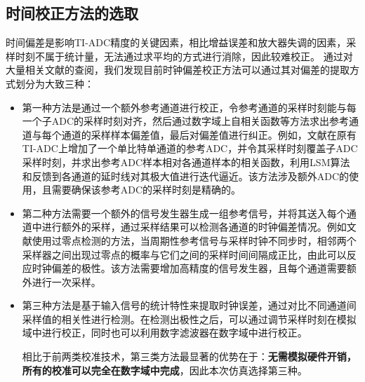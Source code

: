 \documentclass[cs4size,a4paper]{ctexart}
\numberwithin{equation}{section}
\numberwithin{table}{section}
\numberwithin{figure}{section}
\begin{document}
		\subsection{时间校正方法的选取}
		时间偏差是影响TI-ADC精度的关键因素，相比增益误差和放大器失调的因素，采样时刻不属于统计量，无法通过求平均的方式进行消除，因此较难校正。
		通过对大量相关文献的查阅，我们发现目前时钟偏差校正方法可以通过其对偏差的提取方式划分为大致三种：
		\begin{itemize}
			\item 第一种方法是通过一个额外参考通道进行校正，令参考通道的采样时刻能与每一个子ADC的采样时刻对齐，然后通过数字域上自相关函数等方法求出参考通道与每个通道的采样样本偏差值，最后对偏差值进行纠正。例如，文献\cite{ref1}在原有TI-ADC上增加了一个单比特单通道的参考ADC，并令其采样时刻覆盖子ADC采样时刻，并求出参考ADC样本相对各通道样本的相关函数，利用LSM算法和反馈到各通道的延时线对其极大值进行迭代逼近。该方法涉及额外ADC的使用，且需要确保该参考ADC的采样时刻是精确的。
			
			\item 第二种方法需要一个额外的信号发生器生成一组参考信号，并将其送入每个通道中进行额外的采样，通过采样结果可以检测各通道的时钟偏差情况。例如文献\cite{ref2}使用过零点检测的方法，当周期性参考信号与采样时钟不同步时，相邻两个采样器之间出现过零点的概率与它们之间的采样时间间隔成正比，由此可以反应时钟偏差的极性。该方法需要增加高精度的信号发生器，且每个通道需要额外进行一次采样。
			
			\item 第三种方法是基于输入信号的统计特性来提取时钟误差，通过对比不同通道间采样值的相关性进行检测。在检测出极性之后，可以通过调节采样时刻在模拟域中进行校正，同时也可以利用数字滤波器在数字域中进行校正。
			
			相比于前两类校准技术，第三类方法最显著的优势在于：\textbf{无需模拟硬件开销，所有的校准可以完全在数字域中完成}，因此本次仿真选择第三种。
			
		\end{itemize}
		
\end{document}
